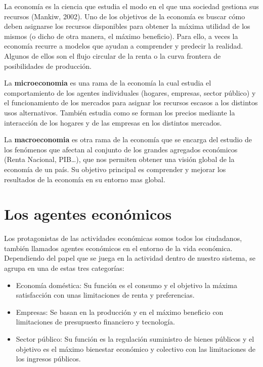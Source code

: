 \documentclass[
]{krantz}
\providecommand{\tightlist}{%
  \setlength{\itemsep}{0pt}\setlength{\parskip}{0pt}}
\begin{document}
La economía es la ciencia que estudia el modo en el que una sociedad gestiona sus recursos (Mankiw, 2002). Uno de los objetivos de la economía es buscar cómo deben asignarse los recursos disponibles para obtener la máxima utilidad de los mismos (o dicho de otra manera, el máximo beneficio). Para ello, a veces la economía recurre a modelos que ayudan a comprender y predecir la realidad. Algunos de ellos son el flujo circular de la renta o la curva frontera de posibilidades de producción.

La \textbf{microeconomia} es una rama de la economía la cual estudia el comportamiento de los agentes individuales (hogares, empresas, sector público) y el funcionamiento de los mercados para asignar los recursos escasos a los distintos usos alternativos.
También estudia como se forman los precios mediante la interacción de los hogares y de las empresas en los distintos mercados.

La \textbf{macroeconomia} es otra rama de la economía que se encarga del estudio de los fenómenos que afectan al conjunto de los grandes agregados económicos (Renta Nacional, PIB\ldots), que nos permiten obtener una visión global de la economía de un país.
Su objetivo principal es comprender y mejorar los resultados de la economía en su entorno mas global.

\hypertarget{los-agentes-econuxf3micos}{%
\section{Los agentes económicos}\label{los-agentes-econuxf3micos}}

Los protagonistas de las actividades económicas somos todos los ciudadanos, también llamados agentes económicos en el entorno de la vida económica. Dependiendo del papel que se juega en la actividad dentro de nuestro sistema, se agrupa en una de estas tres categorías:

\begin{itemize}
\tightlist
\item
  Economía doméstica: Su función es el consumo y el objetivo la máxima satisfacción con unas limitaciones de renta y preferencias.
\item
  Empresas: Se basan en la producción y en el máximo beneficio con limitaciones de presupuesto financiero y tecnología.
\item
  Sector público: Su función es la regulación suministro de bienes públicos y el objetivo es el máximo bienestar económico y colectivo con las limitaciones de los ingresos públicos.
\end{itemize}
\end{document}
